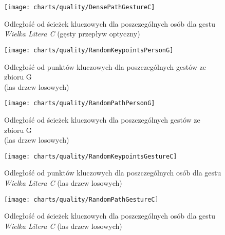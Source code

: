     \begin{figure}[!ht]
      \centering
      \texttt{[image: charts/quality/DensePathGestureC]}
      \caption[Odległość od ścieżek kluczowych dla poszczególnych osób dla gestu C]
              {Odległość od ścieżek kluczowych dla poszczególnych osób dla gestu\\\textit{Wielka Litera C} (gęsty przepływ optyczny)}
      \label{fig:DensePathGestureC}
    \end{figure}

    \newpage
    \begin{figure}[!ht]
      \centering
      \texttt{[image: charts/quality/RandomKeypointsPersonG]}
      \caption[Odległość od punktów kluczowych dla poszczególnych gestów]
              {Odległość od punktów kluczowych dla poszczególnych gestów ze zbioru G\\(las drzew losowych)}
      \label{fig:RandomKeypointsPersonG}
    \end{figure}

    \begin{figure}[!ht]
      \centering
      \texttt{[image: charts/quality/RandomPathPersonG]}
      \caption[Odległość od ścieżek kluczowych dla poszczególnych gestów]
              {Odległość od ścieżek kluczowych dla poszczególnych gestów ze zbioru G\\(las drzew losowych)}
      \label{fig:RandomPathPersonG}
    \end{figure}

    \newpage
    \begin{figure}[!ht]
      \centering
      \texttt{[image: charts/quality/RandomKeypointsGestureC]}
      \caption[Odległość od punktów kluczowych dla poszczególnych osób dla gestu C]
              {Odległość od punktów kluczowych dla poszczególnych osób dla gestu\\\textit{Wielka Litera C} (las drzew losowych)}
      \label{fig:RandomKeypointsGestureC}
    \end{figure}

    \begin{figure}[!ht]
      \centering
      \texttt{[image: charts/quality/RandomPathGestureC]}
      \caption[Odległość od ścieżek kluczowych dla poszczególnych osób dla gestu C]
              {Odległość od ścieżek kluczowych dla poszczególnych osób dla gestu\\\textit{Wielka Litera C} (las drzew losowych)}
      \label{fig:RandomPathGestureC}
    \end{figure}

